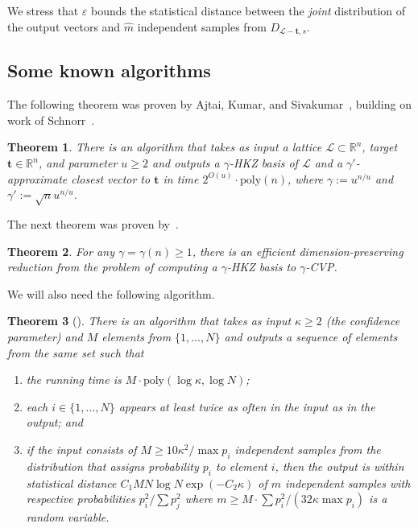 \documentclass[11pt]{article}
\newtheorem{theorem}{Theorem}[section]
\newcommand{\R}{\ensuremath{\mathbb{R}}}
\newcommand{\eps}{\varepsilon}
\renewcommand{\vec}[1]{\ensuremath{\mathbf{#1}}}
\newcommand{\poly}{\mathrm{poly}}
\newcommand{\lat}{\mathcal{L}}
\begin{document}
We stress that $\eps$ bounds the statistical distance between the \emph{joint} distribution of the output vectors and $\hat{m}$ independent samples from $D_{\lat - \vec{t},s}$. 

\subsection{Some known algorithms}

The following theorem was proven by Ajtai, Kumar, and Sivakumar~\cite{AKS01}, building on work of Schnorr~\cite{Schnorr87}.
\begin{theorem}
\label{thm:BKZ}
There is an algorithm that takes as input a lattice $\lat \subset \R^n$, target $\vec{t} \in \R^n$, and parameter $u \geq 2$ and outputs a $\gamma$-HKZ basis of $\lat$ and a $\gamma'$-approximate closest vector to $\vec{t}$ in time $2^{O(u)} \cdot \poly(n)$, where $\gamma := u^{n/u}$ and $\gamma' := \sqrt{n} u^{n/u}$.
\end{theorem}

The next theorem was proven by~\cite{GMSS99}.

\begin{theorem}
\label{thm:HKZtoCVP}
For any $\gamma = \gamma(n) \geq 1$, there is an efficient dimension-preserving reduction from the problem of computing a $\gamma$-HKZ basis to $\gamma$-CVP.
\end{theorem}

We will also need the following algorithm.
\begin{theorem}[{\cite[Theorem 3.3]{ADRS15}}]
\label{thm:squaresampler}
There is an algorithm that takes as input $\kappa \geq 2$ (the confidence parameter)
and $M$ elements from $\{1, \ldots, N \}$ and outputs a sequence of elements from the same set such that
\begin{enumerate}
\item \label{item:squareruntime} the running time is $M \cdot \poly(\log \kappa, \log N)$;
\item \label{item:squareinputoutput} each $i \in \{1,\ldots, N\}$ appears at least twice as often in the input as in the output; and
\item  \label{item:squaredistribution} if the input consists of 
$M \geq 10 \kappa^2/\max p_i$ 
independent samples from the distribution that assigns probability $p_i$ to element $i$, then
the output is within statistical distance $C_1 M N \log N \exp(-C_2\kappa)$ of $m$ independent samples with respective probabilities $p_i^2/\sum p_j^2$ where $m \geq  M\cdot \sum p_i^2/(32\kappa \max p_i)$ is a random variable.
\end{enumerate}
\end{theorem}
\end{document}
